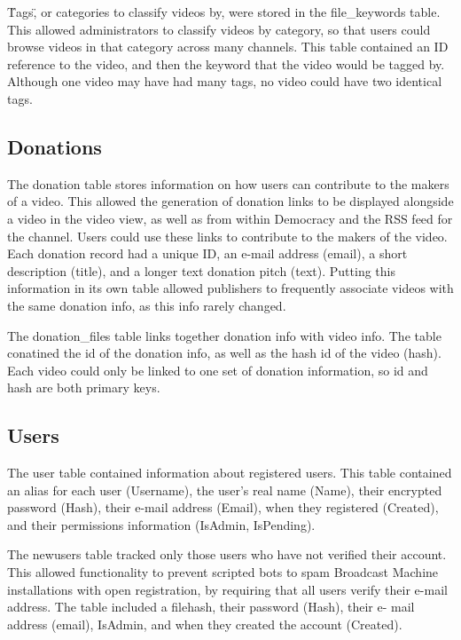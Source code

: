 \documentclass[a4paper,12pt]{report}
\begin{document}
\"Tags\", or categories to classify videos by, were stored in the file\_keywords table. This allowed administrators to classify videos by category, so that users could browse videos in that category across many channels. This table contained an ID reference to the video, and then the keyword that the video would be tagged by. Although one video may have had many tags, no video could have two identical tags.


\subsection{Donations}
The donation table stores information on how users can contribute to the makers of a video. This allowed the generation of donation links to be displayed alongside a video in the video view, as well as from within Democracy and the RSS feed for the channel. Users could use these links to contribute to the makers of the video. Each donation record had a unique ID, an e-mail address (email), a short description (title), and a longer text donation pitch (text). Putting this information in its own table allowed publishers to frequently associate videos with the same donation info, as this info rarely changed. 


The donation\_files table links together donation info with video info. The table conatined the id of the donation info, as well as the hash id of the video (hash). Each video could only be linked to one set of donation information, so id and hash are both primary keys.


\subsection{Users}
The user table contained information about registered users. This table contained an alias for each user (Username), the user's real name (Name), their encrypted password (Hash), their e-mail address (Email), when they registered (Created), and their permissions information (IsAdmin, IsPending). 


The newusers table tracked only those users who have not verified their account. This allowed functionality to prevent scripted bots to spam Broadcast Machine installations with open registration, by requiring that all users verify their e-mail address. The table included a filehash, their password (Hash), their e- mail address (email), IsAdmin, and when they created the account (Created).
\end{document}

